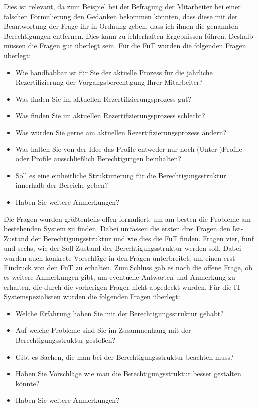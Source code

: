 \newline
Dies ist relevant, da zum Beispiel bei der Befragung der Mitarbeiter bei einer falschen Formulierung den Gedanken bekommen könnten, dass diese mit der Beantwortung der Frage ihr in Ordnung geben, dass ich ihnen die genannten Berechtigungen entfernen.
Dies kann zu fehlerhaften Ergebnissen führen.
Deshalb müssen die Fragen gut überlegt sein.
\newline
\newline
Für die \ac{FuT} wurden die folgenden Fragen überlegt: 
\begin{itemize}
	\item Wie handhabbar ist für Sie der aktuelle Prozess für die jährliche Rezertifizierung der Vorgangsberechtigung Ihrer Mitarbeiter?
	\item Was finden Sie im aktuellen Rezertifizierungsprozess gut?
	\item Was finden Sie im aktuellen Rezertifizierungsprozess schlecht?
	\item Was würden Sie gerne am aktuellen Rezertifizierungsprozess ändern?
	\item Was halten Sie von der Idee das Profile entweder nur noch (Unter-)Profile oder Profile ausschließlich Berechtigungen beinhalten?
	\item Soll es eine einheitliche Strukturierung für die Berechtigungsstruktur innerhalb der Bereiche geben?
	\item Haben Sie weitere Anmerkungen?
\end{itemize}
Die Fragen wurden größtenteils offen formuliert, um am besten die Probleme am bestehenden System zu finden.
Dabei umfassen die ersten drei Fragen den Ist-Zustand der Berechtigungsstruktur und wie dies die \ac{FuT} finden.
Fragen vier, fünf und sechs, wie der Soll-Zustand der Berechtigungsstruktur werden soll.
Dabei wurden auch konkrete Vorschläge in den Fragen unterbreitet, um einen erst Eindruck von den \ac{FuT} zu erhalten.
Zum Schluss gab es noch die offene Frage, ob es weitere Anmerkungen gibt, um eventuelle Antworten und Anmerkung zu erhalten, die durch die vorherigen Fragen nicht abgedeckt wurden.
\newline
\newline
Für die IT-Systemspezialisten wurden die folgenden Fragen überlegt: 
\begin{itemize}
	\item Welche Erfahrung haben Sie mit der Berechtigungsstruktur gehabt?
	\item Auf welche Probleme sind Sie im Zusammenhang mit der Berechtigungsstruktur gestoßen?
	\item Gibt es Sachen, die man bei der Berechtigungsstruktur beachten muss?
	\item Haben Sie Vorschläge wie man die Berechtigungsstruktur besser gestalten könnte?
	\item Haben Sie weitere Anmerkungen?
\end{itemize}
